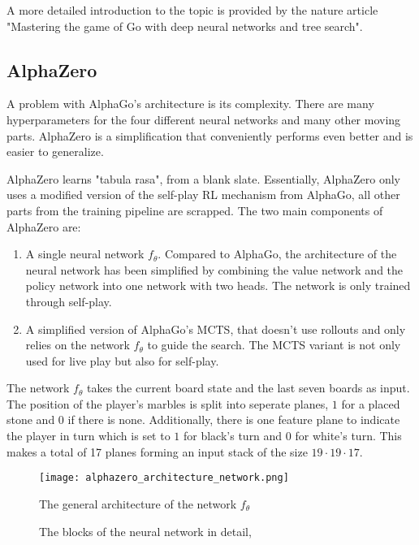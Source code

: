 A more detailed introduction to the topic is provided by the nature article "Mastering the game of Go with deep neural networks and tree search". \cite{silver_mastering_2016}

\subsection{AlphaZero}
A problem with AlphaGo's architecture is its complexity. There are many hyperparameters for the four different neural networks and many other moving parts. AlphaZero is a simplification that conveniently performs even better and is easier to generalize.

AlphaZero learns "tabula rasa", from a blank slate. Essentially, AlphaZero only uses a modified version of the self-play RL mechanism from AlphaGo, all other parts from the training pipeline are scrapped. The two main components of AlphaZero are:

\begin{enumerate}
    \item A single neural network $f_{\theta}$. Compared to AlphaGo, the architecture of the neural network has been simplified by combining the value network and the policy network into one network with two heads. The network is only trained through self-play.
    \item A simplified version of AlphaGo's MCTS, that doesn't use rollouts and only relies on the network $f_{\theta}$ to guide the search. The MCTS variant is not only used for live play but also for self-play.
\end{enumerate}

The network $f_{\theta}$ takes the current board state and the last seven boards as input. The position of the player's marbles is split into seperate planes, $1$ for a placed stone and $0$ if there is none. Additionally, there is one feature plane to indicate the player in turn which is set to $1$ for black's turn and $0$ for white's turn. This makes a total of 17 planes forming an input stack of the size $19 \cdot 19 \cdot 17$.

\begin{figure}
    \centering
    \texttt{[image: alphazero\_architecture\_network.png]}
    \caption{The general architecture of the network $f_{\theta}$ \cite[cf. p. 27ff.]{silver_mastering_2017}}
    \label{alpha_zero_neural_network}
\end{figure}

\begin{figure}[!h]
    \centering
    \hfill
    \hfill
    \caption{The blocks of the neural network in detail, \cite[cf. p. 27ff.]{silver_mastering_2017}}
    \label{alpha_zero_blocks}
\end{figure}

